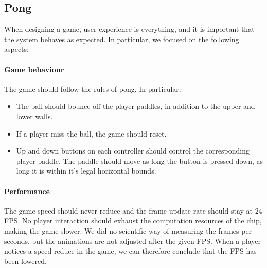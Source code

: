 \subsection{Pong}
\label{subsection:pong-testing}
When designing a game, user experience is everything, and it is important that the system behaves as expected. In particular, we focused on the following aspects:

\paragraph{Game behaviour}
The game should follow the rules of pong. In particular:
\begin{itemize}
	\item The ball should bounce off the player paddles, in addition to the upper and lower walls.
	\item If a player miss the ball, the game should reset.
	\item Up and down buttons on each controller should control the corresponding player paddle. The paddle should move as long the button is pressed down, as long it is within it's legal horizontal bounds.
\end{itemize}

\paragraph{Performance}
The game speed should never reduce and the frame update rate should stay at 24 FPS. No player interaction should exhaust the computation resources of the chip, making the game slower. We did no scientific way of measuring the frames per seconds, but the animations are not adjusted after the given FPS. When a player notices a speed reduce in the game, we can therefore conclude that the FPS has been lowered.

